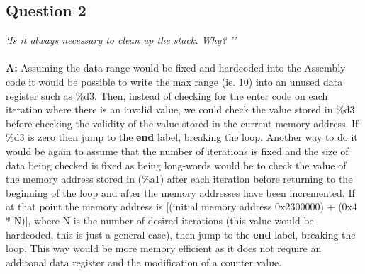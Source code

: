 \documentclass[letterpaper]{article}
\begin{document}
    \subsection{Question 2}
      \textit{`Is it always necessary to clean up the stack. Why? ''}
      \\ \\
      \noindent\textbf{A:}
      Assuming the data range would be fixed and hardcoded into the Assembly code it would be possible to
      write the max range (ie. 10) into an unused data register such as \%d3.  Then, instead of checking
      for the enter code on each iteration where there is an invalid value, we could check the value stored in
      \%d3 before checking the validity of the value stored in the current memory address.  If \%d3 is
      zero then jump to the \textbf{end} label, breaking the loop.  Another way to do it would be again
      to assume that the number of iterations is fixed and the size of data being checked is fixed as being
      long-words would be to check the value of the memory address stored in (\%a1) after each iteration
      before returning to the beginning of the loop and after the memory addresses have been incremented.
      If at that point the memory address is [(initial memory address 0x2300000) + (0x4 * N)], where N is
      the number of desired iterations (this value would be hardcoded, this is just a general case), then
      jump to the \textbf{end} label, breaking the loop.  This way would be more memory efficient as it
      does not require an additonal data register and the modification of a counter value.
\end{document}
